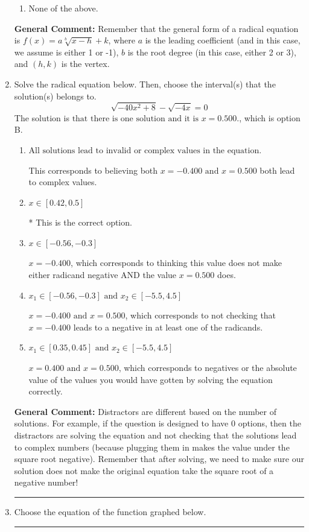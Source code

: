 \documentclass{extbook}[14pt]
\newcommand{\litem}[1]{\item #1

\rule{\textwidth}{0.4pt}}
\begin{document}
\begin{enumerate}
{\begin{enumerate}[label=\Alph*.]
\begin{multicols}{2}
\end{multicols}\item None of the above.\end{enumerate}
\textbf{General Comment:} Remember that the general form of a radical equation is $ f(x) = a \sqrt[b]{x - h} + k $, where $a$ is the leading coefficient (and in this case, we assume is either 1 or -1), $b$ is the root degree (in this case, either 2 or 3), and $(h, k)$ is the vertex.
}
\litem{
Solve the radical equation below. Then, choose the interval(s) that the solution(s) belongs to.
\[ \sqrt{-40 x^2 + 8} - \sqrt{-4 x} = 0 \]The solution is \( \text{that there is one solution and it is } x = 0.500. \), which is option B.\begin{enumerate}[label=\Alph*.]
\item \( \text{All solutions lead to invalid or complex values in the equation.} \)

This corresponds to believing both $x = -0.400 \text{ and } x = 0.500$ both lead to complex values.
\item \( x \in [0.42,0.5] \)

* This is the correct option.
\item \( x \in [-0.56,-0.3] \)

$x = -0.400$, which corresponds to thinking this value does not make either radicand negative AND the value $x = 0.500$ does.
\item \( x_1 \in [-0.56, -0.3] \text{ and } x_2 \in [-5.5,4.5] \)

$x = -0.400 \text{ and } x = 0.500$, which corresponds to not checking that $x = -0.400$ leads to a negative in at least one of the radicands.
\item \( x_1 \in [0.35, 0.45] \text{ and } x_2 \in [-5.5,4.5] \)

$x = 0.400 \text{ and } x = 0.500$, which corresponds to negatives or the absolute value of the values you would have gotten by solving the equation correctly.
\end{enumerate}

\textbf{General Comment:} Distractors are different based on the number of solutions. For example, if the question is designed to have 0 options, then the distractors are solving the equation and not checking that the solutions lead to complex numbers (because plugging them in makes the value under the square root negative). Remember that after solving, we need to make sure our solution does not make the original equation take the square root of a negative number!
}
\litem{
Choose the equation of the function graphed below.

}
\end{enumerate}
\end{document}
